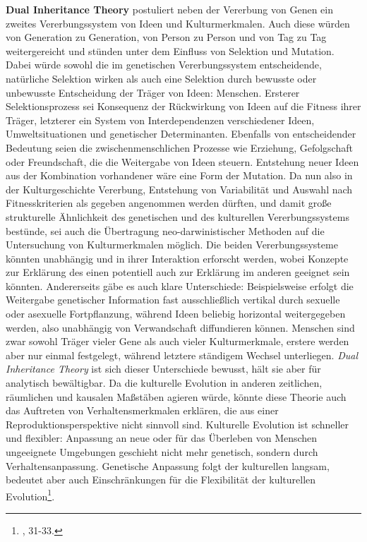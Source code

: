 \documentclass[openany,twoside,twocolumn]{book}
\let\rmarkdownfootnote\footnote%
\def\footnote{\protect\rmarkdownfootnote}
\begin{document}
\textbf{Dual Inheritance Theory} postuliert neben der Vererbung von
Genen ein zweites Vererbungssystem von Ideen und Kulturmerkmalen. Auch
diese würden von Generation zu Generation, von Person zu Person und von
Tag zu Tag weitergereicht und stünden unter dem Einfluss von Selektion
und Mutation. Dabei würde sowohl die im genetischen Vererbungssystem
entscheidende, natürliche Selektion wirken als auch eine Selektion durch
bewusste oder unbewusste Entscheidung der Träger von Ideen: Menschen.
Ersterer Selektionsprozess sei Konsequenz der Rückwirkung von Ideen auf
die Fitness ihrer Träger, letzterer ein System von Interdependenzen
verschiedener Ideen, Umweltsituationen und genetischer Determinanten.
Ebenfalls von entscheidender Bedeutung seien die zwischenmenschlichen
Prozesse wie Erziehung, Gefolgschaft oder Freundschaft, die die
Weitergabe von Ideen steuern. Entstehung neuer Ideen aus der Kombination
vorhandener wäre eine Form der Mutation. Da nun also in der
Kulturgeschichte Vererbung, Entstehung von Variabilität und Auswahl nach
Fitnesskriterien als gegeben angenommen werden dürften, und damit große
strukturelle Ähnlichkeit des genetischen und des kulturellen
Vererbungssystems bestünde, sei auch die Übertragung neo-darwinistischer
Methoden auf die Untersuchung von Kulturmerkmalen möglich. Die beiden
Vererbungssysteme könnten unabhängig und in ihrer Interaktion erforscht
werden, wobei Konzepte zur Erklärung des einen potentiell auch zur
Erklärung im anderen geeignet sein könnten. Andererseits gäbe es auch
klare Unterschiede: Beispielsweise erfolgt die Weitergabe genetischer
Information fast ausschließlich vertikal durch sexuelle oder asexuelle
Fortpflanzung, während Ideen beliebig horizontal weitergegeben werden,
also unabhängig von Verwandschaft diffundieren können. Menschen sind
zwar sowohl Träger vieler Gene als auch vieler Kulturmerkmale, erstere
werden aber nur einmal festgelegt, während letztere ständigem Wechsel
unterliegen. \emph{Dual Inheritance Theory} ist sich dieser Unterschiede
bewusst, hält sie aber für analytisch bewältigbar. Da die kulturelle
Evolution in anderen zeitlichen, räumlichen und kausalen Maßstäben
agieren würde, könnte diese Theorie auch das Auftreten von
Verhaltensmerkmalen erklären, die aus einer Reproduktionsperspektive
nicht sinnvoll sind. Kulturelle Evolution ist schneller und flexibler:
Anpassung an neue oder für das Überleben von Menschen ungeeignete
Umgebungen geschieht nicht mehr genetisch, sondern durch
Verhaltensanpassung. Genetische Anpassung folgt der kulturellen langsam,
bedeutet aber auch Einschränkungen für die Flexibilität der kulturellen
Evolution\footnote{\textcite{SmithThreestylesevolutionary2000}, 31-33.}.
\end{document}

